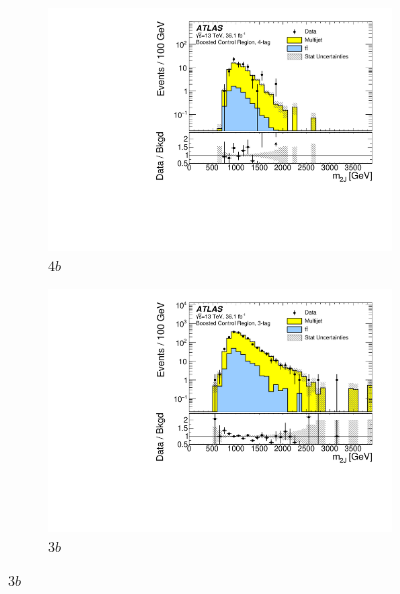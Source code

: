 \begin{figure}[htbp!]
  \centering
  \captionsetup{justification=centering}
    \hspace{-2cm}
    \begin{subfigure}[b]{0.35\textwidth}
        \includegraphics[width=\textwidth,angle=-90]{figures/boosted/Paperplot/Moriond_bkg_9_FourTag_Control_mHH_l_1.pdf}
        \caption{$4b$}
        \label{fig:boosted-cr-mjj-4b}
    \end{subfigure}
    \quad \quad \quad \quad \quad
    \begin{subfigure}[b]{0.35\textwidth}
        \includegraphics[width=\textwidth,angle=-90]{figures/boosted/Paperplot/Moriond_bkg_9_ThreeTag_Control_mHH_l_1.pdf}
        \caption{$3b$}
        \label{fig:boosted-cr-mjj-3b}
    \end{subfigure}

\end{figure}
